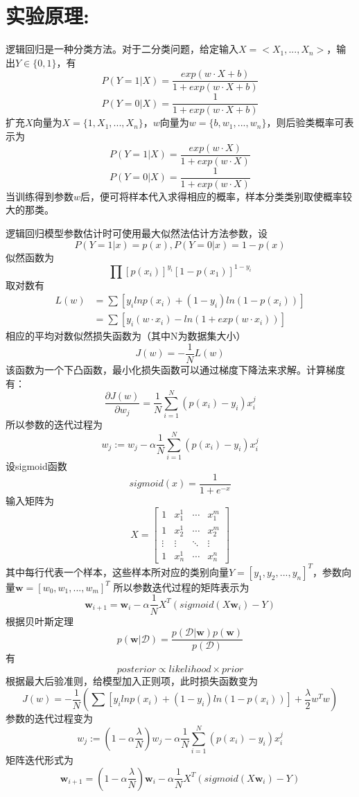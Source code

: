 \documentclass[a4paper,11pt,UTF8]{ctexart}
\begin{document}
\section{实验原理:}
逻辑回归是一种分类方法。对于二分类问题，给定输入$X = <X_{1}, ... , X_{n}>$，输出$Y \in \{0,1\}$，有
$$P(Y = 1 | X) = \frac{exp(w \cdot X + b)}{1 + exp(w \cdot X + b)}$$
$$P(Y = 0 | X) = \frac{1}{1+exp(w \cdot X + b)} $$
扩充$X$向量为$X = \{1, X_{1}, ... ,X_{n}\}$，$w$向量为$w = \{b, w_{1}, ... , w_{n}\}$，则后验类概率可表示为
$$P(Y = 1 | X) = \frac{exp(w \cdot X)}{1 + exp(w \cdot X)}$$
$$P(Y = 0 | X) = \frac{1}{1+exp(w \cdot X)} $$
当训练得到参数$w$后，便可将样本代入求得相应的概率，样本分类类别取使概率较大的那类。 \par
逻辑回归模型参数估计时可使用最大似然法估计方法参数，设
$$P(Y = 1 | x) = p(x), P(Y = 0 | x) = 1 - p(x)$$
似然函数为
$$\prod [p(x_{i})]^{y_{i}}[1-p(x_{1})]^{1 - y_{i}}$$
取对数有
\begin{equation}  
  \begin{aligned}
    L(w) &= \sum [y_{i}lnp(x_{i}) + (1 - y_{i})ln(1-p(x_{i}))] \\
    &= \sum[y_{i}(w\cdot x_{i}) - ln(1 + exp(w \cdot x_{i}))] \nonumber
  \end{aligned}
\end{equation}
相应的平均对数似然损失函数为（其中N为数据集大小）
$$ J(w) = - \frac{1}{N}L(w)$$
该函数为一个下凸函数，最小化损失函数可以通过梯度下降法来求解。计算梯度有：
$$ \frac{\partial J(w)}{\partial w_{j}} = \frac{1}{N}\sum_{i = 1}^{N}(p(x_{i}) - y_{i})x_{i}^{j}$$
所以参数的迭代过程为
$$w_{j} := w_{j} - \alpha \frac{1}{N} \sum_{i = 1}^{N}(p(x_{i}) - y_{i})x_{i}^{j}$$
设sigmoid函数$$ sigmoid(x) = \frac{1}{1 + e^{-x}}$$
输入矩阵为
$$
X = \begin{bmatrix}
1 & x_{1}^{1} & \cdots & x_{1}^{m} \\
1 & x_{2}^{1} & \cdots & x_{2}^{m} \\
\vdots & \vdots & \ddots & \vdots \\
1 & x_{n}^{1} & \cdots & x_{n}^{n}
\end{bmatrix}
$$
其中每行代表一个样本，这些样本所对应的类别向量$Y = [y_{1}, y_{2}, ... ,y_{n}]^{T}$，参数向量$ \bm{w} = [w_{0}, w_{1}, ..., w_{m}]^{T}$
所以参数迭代过程的矩阵表示为
$$ \bm{w}_{i+1} = \bm{w} _{i} - \alpha \frac{1}{N} X^{T}(sigmoid(X\bm{w}_{i}) - Y)$$
根据贝叶斯定理
$$p(\bm{w} | \mathcal{D}) = \frac{p( \mathcal{D} | \bm{w})p(\bm{w})}{p(\mathcal{D})} $$
有
$$ posterior \propto likelihood \times prior$$
根据最大后验准则，给模型加入正则项，此时损失函数变为
$$ J(w) = - \frac{1}{N}(\sum [y_{i}lnp(x_{i}) + (1 - y_{i})ln(1-p(x_{i}))] + \frac{ \lambda }{2}w^{T}w)$$
参数的迭代过程变为
$$w_{j} := (1 - \alpha \frac{\lambda}{N})w_{j} - \alpha \frac{1}{N} \sum_{i = 1}^{N}(p(x_{i}) - y_{i})x_{i}^{j}$$
矩阵迭代形式为
$$ \bm{w}_{i+1} = (1 - \alpha \frac{\lambda}{N})\bm{w} _{i} - \alpha \frac{1}{N} X^{T}(sigmoid(X\bm{w}_{i}) - Y)$$
\end{document}
